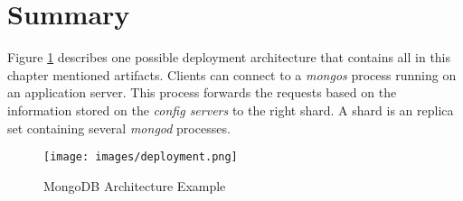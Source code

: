 \section{Summary}
Figure \ref{arch-example} describes one possible deployment architecture that contains all in this chapter mentioned artifacts. Clients can connect to a \textit{mongos} process running on an application server. This process forwards the requests based on the information stored on the \textit{config servers} to the right shard. A shard is an replica set containing several \textit{mongod} processes.
\begin{figure}[H]
\texttt{[image: images/deployment.png]}
\caption{MongoDB Architecture Example}
\label{arch-example}
\end{figure}


